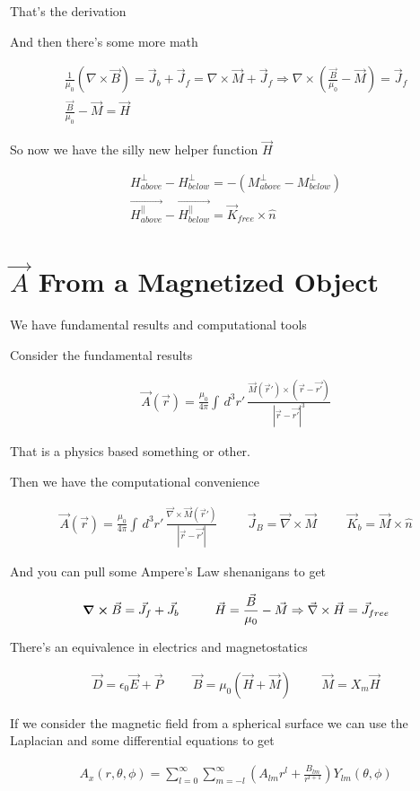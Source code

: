 \documentclass[fleqn]{report}
\newcommand{\hp}{\hspace{1cm}}
\newcommand{\equations} [1] {
\begin{gather*}
#1
\end{gather*}
}
\begin{document}
That's the derivation 

And then there's some more math 

\equations{
    \frac{1}{\mu_0}
    (\nabla \times \vec B)
    =
    \vec J_b + \vec J_f 
    =
    \nabla \times \vec M + \vec J_f 
    \Rightarrow 
    \nabla \times 
    \left(
        \frac{\vec B}{\mu_0}
        -
        \vec M 
    \right)
    =
    \vec J_f
    \\
    \frac{\vec B}{\mu_0}
    -
    \vec M 
    =
    \vec H 
}

So now we have the silly new helper function $\vec H$ 

\equations{
    H^{\perp}_{above}
    -
    H^{\perp}_{below}
    =
    -
    \left(
        M^{\perp}_{above}
        -
        M^{\perp}_{below}
    \right)
    \\
    \vec{H^{||}_{above}}
    -
    \vec{H^{||}_{below}}
    =
    \vec K_{free}
    \times 
    \hat n 
}


\section{$\vec A$ From a Magnetized Object}
We have fundamental results and computational tools 

Consider the fundamental results 
\equations{
    \vec A(\vec r)
    =
    \frac{\mu_0}{4 \pi}
    \int \, d^3 r' \, 
    \frac{\vec M(\vec r') \times (\vec r - \vec{r'})}
    {|\vec r - \vec{r'}|^3}
}
That is a physics based something or other.

Then we have the computational convenience 
\equations{
    \vec A(\vec r)
    =
    \frac{\mu_0}{4 \pi}
    \int \, d^3 r' \, 
    \frac{\vec \nabla \times \vec M(\vec r')}
    {|\vec r - \vec{r'}|}
    \hp
    \vec J_B = \vec \nabla \times \vec M 
    \hp 
    \vec K_b = \vec M \times \hat n 
}

And you can pull some Ampere's Law shenanigans to get 
\equations{
    \curl \vec B = \vec J_f + \vec J_b
    \hp 
    \vec H = \frac{\vec B}{\mu_0} - \vec M 
    \Rightarrow 
    \vec \nabla 
    \times 
    \vec H 
    =
    \vec J_{free}
}

There's an equivalence in electrics and magnetostatics 
\equations{
    \vec D = \epsilon_0 \vec E + \vec P 
    \hp 
    \vec B 
    =
    \mu_0 
    \left( 
        \vec H 
        + 
        \vec M 
    \right)
    \hp 
    \vec M = X_m \vec H 
}

If we consider the magnetic field from a spherical surface 
we can use the Laplacian and some differential equations to get 
\equations{
    A_x (r, \theta, \phi)
    =
    \sum_{l = 0}^{\infty}
    \sum_{m = -l}^{\infty}
    \left(
        A_{lm}
        r^l 
        +
        \frac{B_{lm}}{r^{l + 1}}
    \right)
    Y_{lm}(\theta, \phi)
}
\end{document}
